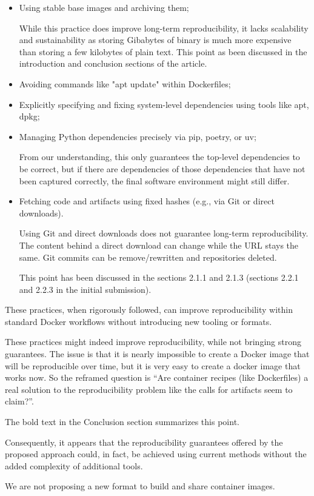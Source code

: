 \documentclass[%
	11pt,
	final,
]{article}
\begin{document}
\begin{itemize}
\item Using stable base images and archiving them;
  \begin{review-answer}
    While this practice does improve long-term reproducibility, it lacks scalability and sustainability as storing Gibabytes of binary is much more expensive than storing a few kilobytes of plain text.
    This point as been discussed in the introduction and conclusion sections of the article.
  \end{review-answer}
\item Avoiding commands like "apt update" within Dockerfiles;
\item Explicitly specifying and fixing system-level dependencies using tools like apt, dpkg;
\item Managing Python dependencies precisely via pip, poetry, or uv;
  \begin{review-answer}
    From our understanding, this only guarantees the top-level dependencies to be correct, but if there are dependencies of those dependencies that have not been captured correctly, the final software environment might still differ.
  \end{review-answer}
\item Fetching code and artifacts using fixed hashes (e.g., via Git or direct downloads).
  \begin{review-answer}
    Using Git and direct downloads does not guarantee long-term reproducibility.
    The content behind a direct download can change while the URL stays the same.
    Git commits can be remove/rewritten and repositories deleted.

    This point has been discussed in the sections 2.1.1 and 2.1.3 (sections 2.2.1 and 2.2.3 in the initial submission).
  \end{review-answer}
\end{itemize}

These practices, when rigorously followed, can improve reproducibility within standard Docker workflows without introducing new tooling or formats.
\begin{review-answer}
  These practices might indeed improve reproducibility, while not bringing strong guarantees.
  The issue is that it is nearly impossible to create a Docker image that will be reproducible over time, but it is very easy to create a docker image that works now.
  So the reframed question is ``Are container recipes (like Dockerfiles) a real solution to the reproducibility problem like the calls for artifacts seem to claim?''.

  The bold text in the Conclusion section summarizes this point.
\end{review-answer}
Consequently, it appears that the reproducibility guarantees offered by the proposed approach could, in fact, be achieved using current methods without the added complexity of additional tools.
\begin{review-answer}
  We are not proposing a new format to build and share container images.
\end{review-answer}
\end{document}
